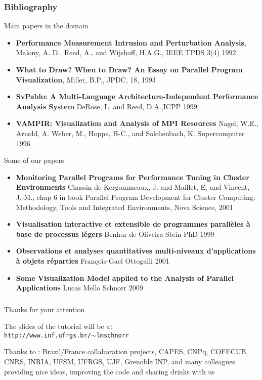 \begin{frame}
\frametitle{Bibliography}
\tiny{
\begin{block}{Main papers in the domain}
\begin{itemize}
\item \textbf{{P}erformance {M}easurement {I}ntrusion and {P}erturbation {A}nalysis},
Malony, A. D., Reed, A., and Wijshoff, H.A.G., IEEE TPDS 3(4) 1992\\
\item \textbf{What to Draw? When to Draw? An Essay on Parallel Program Visualization},
Miller, B.P., JPDC, 18, 1993\\
\item \textbf{SvPablo: A Multi-Language Architecture-Independent Performance Analysis System}
DeRose, L. and Reed, D.A.,ICPP 1999\\
\item \textbf{{VAMPIR}: Visualization and Analysis of {MPI} Resources} Nagel, W.E., Arnold, A. Weber, M., Hoppe, H-C.,  and Solchenbach, K. 
Supercomputer 1996
\end{itemize}
\end{block}
\begin{block}{Some of our papers}
\begin{itemize}
\item \textbf{Monitoring Parallel Programs for Performance Tuning in Cluster Environments} Chassin de Kergommeaux, J. and Maillet, E. and Vincent, J.-M.,
chap 6 in book Parallel Program Development for Cluster Computing:
Methodology, Tools and Integrated Environments, Nova Science, 2001
\item \textbf{Visualisation interactive et extensible de programmes parall\`eles à base de processus légers} Benhur de Oliveira Stein PhD 1999
\item \textbf{Observations et analyses quantitatives multi-niveaux d’applications \`a objets r\'eparties} François-Gael Ottogalli 2001
\item \textbf{Some Visualization Model applied to the Analysis of Parallel Applications} Lucas Mello Schnorr 2009
\end{itemize}
\end{block}
}
\end{frame}
\begin{frame}
\frametitle{}
Thanks for your attention


The slides of the tutorial will be at\\
 \texttt{http://www.inf.ufrgs.br/$\sim$lmschnorr}

\vfill

Thanks to : Brazil/France collaboration projects, CAPES, CNPq, COFECUB, CNRS, INRIA, UFSM, UFRGS, UJF, Grenoble INP,  and many colleagues providing nice ideas, improving the code and sharing drinks with us
\end{frame}
